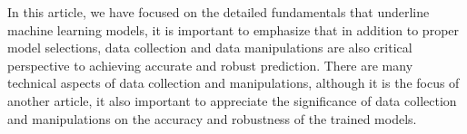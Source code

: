 
\par
In this article, we have focused on the detailed fundamentals that underline machine learning models, it is important to emphasize that in addition to proper model selections, data collection and data manipulations are also critical perspective to achieving accurate and robust prediction. There are many technical aspects of data collection and manipulations, although it is the focus of another article, it also important to appreciate the significance of data collection and manipulations on the accuracy and robustness of the trained models.
\par 
